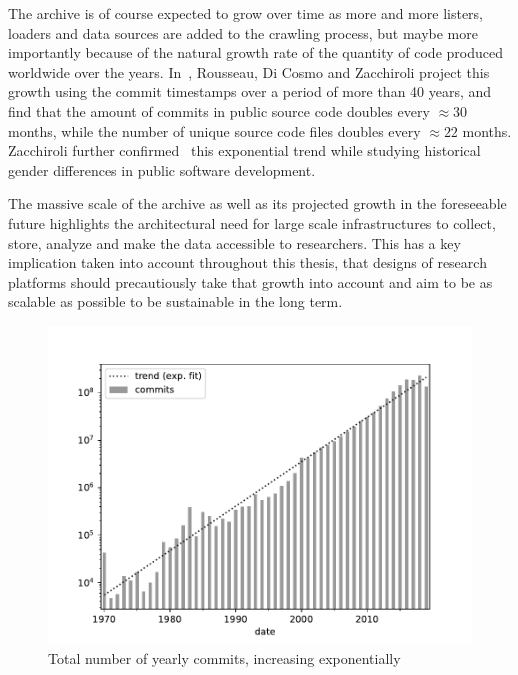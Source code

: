 The archive is of course expected to grow over time as more and more listers,
loaders and data sources are added to the crawling process, but maybe more
importantly because of the natural growth rate of the quantity of code produced
worldwide over the years. In~\cite{swh-provenance-emse}, Rousseau, Di Cosmo and
Zacchiroli project this growth using the commit timestamps over a period of
more than 40 years, and find that the amount of commits in public source code
doubles every $\approx 30$ months, while the number of unique source code files
doubles every $\approx 22$ months. Zacchiroli further
confirmed~\cite{ieee-sw-gender-swh} this exponential trend while studying
historical gender differences in public software development.

The massive scale of the archive as well as its projected growth in the
foreseeable future highlights the architectural need for large scale
infrastructures to collect, store, analyze and make the data accessible to
researchers. This has a key implication taken into account throughout this
thesis, that designs of research platforms should precautiously take that
growth into account and aim to be as scalable as possible to be sustainable in
the long term.

\begin{figure}
    \centering
    \includegraphics[width=0.5\linewidth]{../img/commit-growth}
    \caption{Total number of yearly commits, increasing
    exponentially~\cite{ieee-sw-gender-swh}}%
    \label{fig:swh-commit-growth}
\end{figure}
